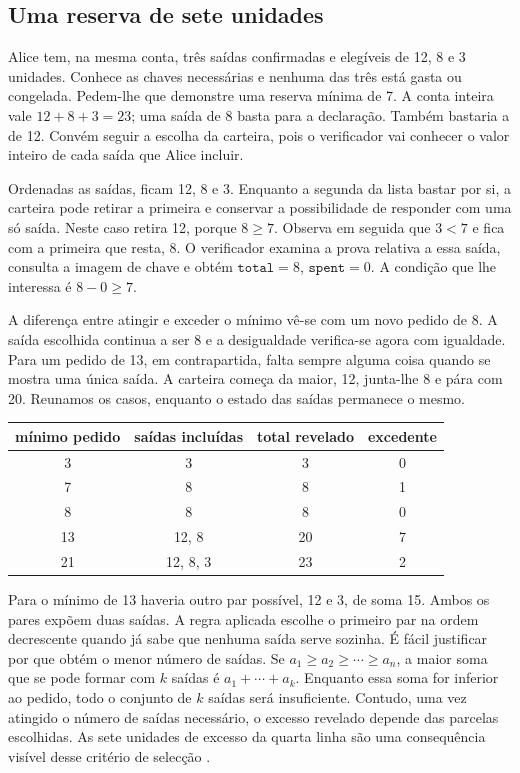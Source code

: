 \subsection{Uma reserva de sete unidades}
\label{subsec:reserva-sete-unidades}

Alice tem, na mesma conta, três saídas confirmadas e elegíveis de 12,
8 e 3 unidades. Conhece as chaves necessárias e nenhuma das três
está gasta ou congelada. Pedem-lhe que demonstre uma reserva mínima de
7. A conta inteira vale \(12+8+3=23\); uma saída de 8 basta para a
declaração. Também bastaria a de 12. Convém seguir a escolha da carteira,
pois o verificador vai conhecer o valor inteiro de cada saída que Alice
incluir.

Ordenadas as saídas, ficam 12, 8 e 3. Enquanto a segunda da lista bastar
por si, a carteira pode retirar a primeira e conservar a possibilidade de
responder com uma só saída. Neste caso retira 12, porque \(8\geq7\).
Observa em seguida que \(3<7\) e fica com a primeira que resta, 8.
O verificador examina a prova relativa a essa saída, consulta a imagem
de chave e obtém \(\texttt{total}=8\), \(\texttt{spent}=0\). A condição
que lhe interessa é \(8-0\geq7\).

A diferença entre atingir e exceder o mínimo vê-se com um novo pedido
de 8. A saída escolhida continua a ser 8 e a desigualdade verifica-se
agora com igualdade. Para um pedido de 13, em contrapartida, falta
sempre alguma coisa quando se mostra uma única saída. A carteira começa
da maior, 12, junta-lhe 8 e pára com 20. Reunamos os casos, enquanto o
estado das saídas permanece o mesmo.

\begin{center}
\begin{tabular}{c|c|c|c}
mínimo pedido & saídas incluídas & total revelado & excedente\\
\hline
3  & 3     &  3 & 0\\
7  & 8     &  8 & 1\\
8  & 8     &  8 & 0\\
13 & 12, 8 & 20 & 7\\
21 & 12, 8, 3 & 23 & 2
\end{tabular}
\end{center}

Para o mínimo de 13 haveria outro par possível, 12 e 3, de soma 15.
Ambos os pares expõem duas saídas. A regra aplicada escolhe o primeiro
par na ordem decrescente quando já sabe que nenhuma saída serve sozinha.
É fácil justificar por que obtém o menor número de saídas. Se
\(a_1\geq a_2\geq\cdots\geq a_n\), a maior soma que se pode formar
com \(k\) saídas é \(a_1+\cdots+a_k\). Enquanto essa soma for
inferior ao pedido, todo o conjunto de \(k\) saídas será insuficiente.
Contudo, uma vez atingido o número de saídas necessário, o excesso
revelado depende das parcelas escolhidas. As sete unidades de excesso
da quarta linha são uma consequência visível desse critério de selecção
\cite{monero-source-v16}.

